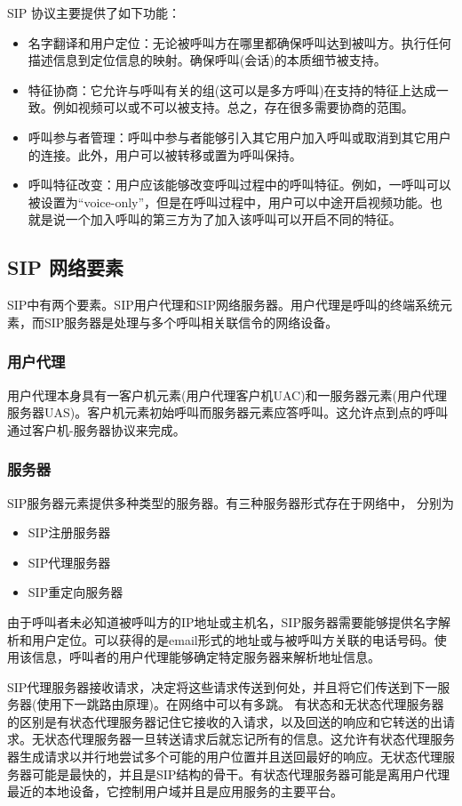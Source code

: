 \documentclass[lang=cn]{elegantpaper}
\begin{document}
SIP 协议主要提供了如下功能：
\begin{itemize}
    \item 名字翻译和用户定位：无论被呼叫方在哪里都确保呼叫达到被叫方。执行任何描述信息到定位信息的映射。确保呼叫(会话)的本质细节被支持。
    \item 特征协商：它允许与呼叫有关的组(这可以是多方呼叫)在支持的特征上达成一致。例如视频可以或不可以被支持。总之，存在很多需要协商的范围。
    \item 呼叫参与者管理：呼叫中参与者能够引入其它用户加入呼叫或取消到其它用户的连接。此外，用户可以被转移或置为呼叫保持。
    \item 呼叫特征改变：用户应该能够改变呼叫过程中的呼叫特征。例如，一呼叫可以被设置为“voice-only”，但是在呼叫过程中，用户可以中途开启视频功能。也就是说一个加入呼叫的第三方为了加入该呼叫可以开启不同的特征。
\end{itemize}


\subsection{SIP 网络要素}

SIP中有两个要素。SIP用户代理和SIP网络服务器。用户代理是呼叫的终端系统元素，而SIP服务器是处理与多个呼叫相关联信令的网络设备。

\subsubsection{用户代理}
用户代理本身具有一客户机元素(用户代理客户机UAC)和一服务器元素(用户代理服务器UAS)。客户机元素初始呼叫而服务器元素应答呼叫。这允许点到点的呼叫通过客户机-服务器协议来完成。

\subsubsection{服务器}

SIP服务器元素提供多种类型的服务器。有三种服务器形式存在于网络中， 分别为
\begin{itemize}
    \item SIP注册服务器
    \item SIP代理服务器
    \item SIP重定向服务器
\end{itemize}
由于呼叫者未必知道被呼叫方的IP地址或主机名，SIP服务器需要能够提供名字解析和用户定位。可以获得的是email形式的地址或与被呼叫方关联的电话号码。使用该信息，呼叫者的用户代理能够确定特定服务器来解析地址信息。

SIP代理服务器接收请求，决定将这些请求传送到何处，并且将它们传送到下一服务器(使用下一跳路由原理)。在网络中可以有多跳。
有状态和无状态代理服务器的区别是有状态代理服务器记住它接收的入请求，以及回送的响应和它转送的出请求。无状态代理服务器一旦转送请求后就忘记所有的信息。这允许有状态代理服务器生成请求以并行地尝试多个可能的用户位置并且送回最好的响应。无状态代理服务器可能是最快的，并且是SIP结构的骨干。有状态代理服务器可能是离用户代理最近的本地设备，它控制用户域并且是应用服务的主要平台。
\end{document}
